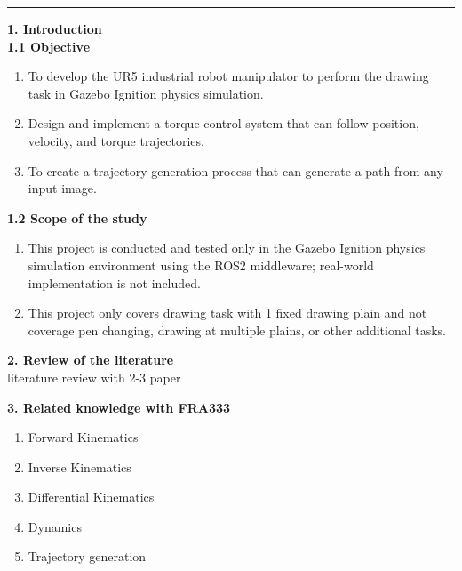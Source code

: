 \documentclass[10pt]{article}
\begin{document}
\vspace{0.4cm}
\noindent
\rule{\textwidth}{1pt}

\linespread{1.5} 
\vspace{0.2cm}
\noindent
\large
\textbf{1. Introduction} \\
\textbf{1.1 Objective}  \\
\normalsize
\vspace*{-0.9\baselineskip}
\begin{enumerate}[nosep, itemsep=-2pt] 
    \item To develop the UR5 industrial robot manipulator to perform the drawing task in Gazebo Ignition physics simulation. 
    \item Design and implement a torque control system that can follow position, velocity, and torque trajectories.
    \item To create a trajectory generation process that can generate a path from any input image.
\end{enumerate}
  
\vspace{8pt}
\noindent
\large 
\textbf{1.2 Scope of the study} \\ 
\normalsize
\vspace*{-0.9\baselineskip} 
\begin{enumerate}[nosep, itemsep=-2pt] 
    \item This project is conducted and tested only in the Gazebo Ignition physics simulation environment using the ROS2 middleware; real-world implementation is not included.
    \item This project only covers drawing task with 1 fixed drawing plain and not coverage pen changing, drawing at multiple plains, or other additional tasks.
\end{enumerate}

\large
\noindent
\textbf{2. Review of the literature} \\
\normalsize
\indent
literature review with 2-3 paper

\large
\noindent
\textbf{3. Related knowledge with FRA333} \\
\normalsize
\vspace*{-0.9\baselineskip} 
\begin{enumerate}[nosep, itemsep=-2pt]
    \item Forward Kinematics 
    \item Inverse Kinematics
    \item Differential Kinematics
    \item Dynamics
    \item Trajectory generation
\end{enumerate}
\end{document}
